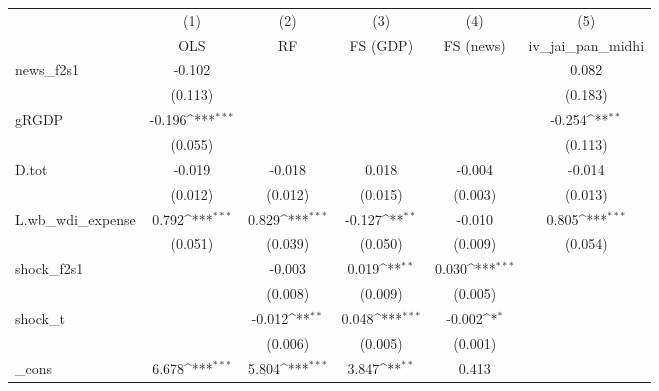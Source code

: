 {
\def\sym#1{\ifmmode^{#1}\else\(^{#1}\)\fi}
\begin{tabular}{l*{5}{c}}
\toprule
            &\multicolumn{1}{c}{(1)}&\multicolumn{1}{c}{(2)}&\multicolumn{1}{c}{(3)}&\multicolumn{1}{c}{(4)}&\multicolumn{1}{c}{(5)}\\
            &\multicolumn{1}{c}{OLS}&\multicolumn{1}{c}{RF}&\multicolumn{1}{c}{FS (GDP)}&\multicolumn{1}{c}{FS (news)}&\multicolumn{1}{c}{iv\_jai\_pan\_midhi}\\
\midrule
news\_f2s1   &      -0.102         &                     &                     &                     &       0.082         \\
            &     (0.113)         &                     &                     &                     &     (0.183)         \\
\addlinespace
gRGDP       &      -0.196\sym{***}&                     &                     &                     &      -0.254\sym{**} \\
            &     (0.055)         &                     &                     &                     &     (0.113)         \\
\addlinespace
D.tot       &      -0.019         &      -0.018         &       0.018         &      -0.004         &      -0.014         \\
            &     (0.012)         &     (0.012)         &     (0.015)         &     (0.003)         &     (0.013)         \\
\addlinespace
L.wb\_wdi\_expense&       0.792\sym{***}&       0.829\sym{***}&      -0.127\sym{**} &      -0.010         &       0.805\sym{***}\\
            &     (0.051)         &     (0.039)         &     (0.050)         &     (0.009)         &     (0.054)         \\
\addlinespace
shock\_f2s1  &                     &      -0.003         &       0.019\sym{**} &       0.030\sym{***}&                     \\
            &                     &     (0.008)         &     (0.009)         &     (0.005)         &                     \\
\addlinespace
shock\_t     &                     &      -0.012\sym{**} &       0.048\sym{***}&      -0.002\sym{*}  &                     \\
            &                     &     (0.006)         &     (0.005)         &     (0.001)         &                     \\
\addlinespace
\_cons      &       6.678\sym{***}&       5.804\sym{***}&       3.847\sym{**} &       0.413         &                     \\

\end{tabular}}
